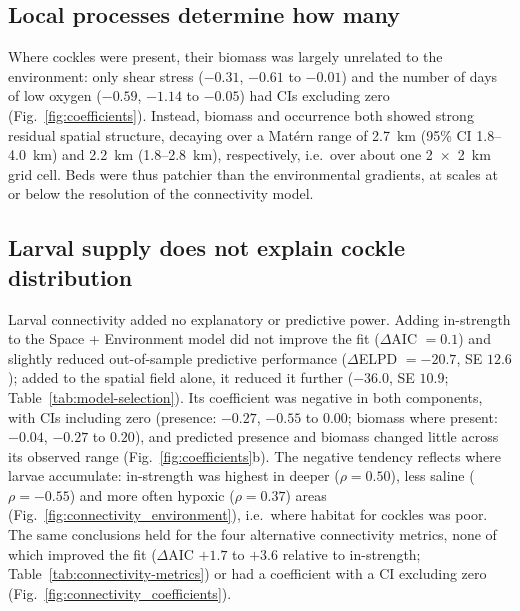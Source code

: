 \subsection{Local processes determine how many}

Where cockles were present, their biomass was largely unrelated to the environment: only shear stress ($-0.31$, $-0.61$ to $-0.01$) and the number of days of low oxygen ($-0.59$, $-1.14$ to $-0.05$) had CIs excluding zero (Fig.~\ref{fig:coefficients}). Instead, biomass and occurrence both showed strong residual spatial structure, decaying over a Mat\'ern range of 2.7~km (95\% CI 1.8--4.0~km) and 2.2~km (1.8--2.8~km), respectively, i.e.\ over about one 2~$\times$~2~km grid cell. Beds were thus patchier than the environmental gradients, at scales at or below the resolution of the connectivity model.

\subsection{Larval supply does not explain cockle distribution}

Larval connectivity added no explanatory or predictive power. Adding in-strength to the Space + Environment model did not improve the fit ($\Delta$AIC $=0.1$) and slightly reduced out-of-sample predictive performance ($\Delta$ELPD $=-20.7$, SE $12.6$); added to the spatial field alone, it reduced it further ($-36.0$, SE $10.9$; Table~\ref{tab:model-selection}). Its coefficient was negative in both components, with CIs including zero (presence: $-0.27$, $-0.55$ to $0.00$; biomass where present: $-0.04$, $-0.27$ to $0.20$), and predicted presence and biomass changed little across its observed range (Fig.~\ref{fig:coefficients}b). The negative tendency reflects where larvae accumulate: in-strength was highest in deeper ($\rho=0.50$), less saline ($\rho=-0.55$) and more often hypoxic ($\rho=0.37$) areas (Fig.~\ref{fig:connectivity_environment}), i.e.\ where habitat for cockles was poor. The same conclusions held for the four alternative connectivity metrics, none of which improved the fit ($\Delta$AIC $+1.7$ to $+3.6$ relative to in-strength; Table~\ref{tab:connectivity-metrics}) or had a coefficient with a CI excluding zero (Fig.~\ref{fig:connectivity_coefficients}).






